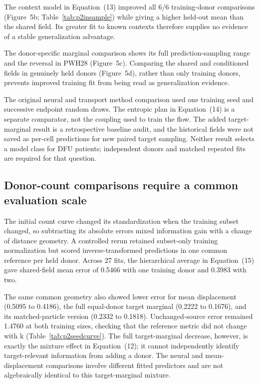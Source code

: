 \documentclass[10pt,a4paper]{article}
\begin{document}
The context model in Equation~(13) improved all 6/6 training-donor comparisons (Figure~5b; Table~\ref{tab:p2insample}) while giving a higher held-out mean than the shared field. Its greater fit to known contexts therefore supplies no evidence of a stable generalization advantage.




The donor-specific marginal comparison shows its full prediction-sampling range and the reversal in PWH28 (Figure~5c). Comparing the shared and conditioned fields in genuinely held donors (Figure~5d), rather than only training donors, prevents improved training fit from being read as generalization evidence.

The original neural and transport method comparison used one training seed and successive endpoint random draws. The entropic plan in Equation~(14) is a separate comparator, not the coupling used to train the flow. The added target-marginal result is a retrospective baseline audit, and the historical fields were not saved as per-cell predictions for new paired target sampling. Neither result selects a model class for DFU patients; independent donors and matched repeated fits are required for that question.

\subsection{Donor-count comparisons require a common evaluation scale}

The initial count curve changed its standardization when the training subset changed, so subtracting its absolute errors mixed information gain with a change of distance geometry. A controlled rerun retained subset-only training normalization but scored inverse-transformed predictions in one common reference per held donor. Across 27 fits, the hierarchical average in Equation~(15) gave shared-field mean error of 0.5466 with one training donor and 0.3983 with two.

The same common geometry also showed lower error for mean displacement (0.5095 to 0.4186), the full equal-donor target marginal (0.2222 to 0.1676), and its matched-particle version (0.2332 to 0.1818). Unchanged-source error remained 1.4760 at both training sizes, checking that the reference metric did not change with k (Table~\ref{tab:p2seedcurve}). The full target-marginal decrease, however, is exactly the mixture effect in Equation~(12); it cannot independently identify target-relevant information from adding a donor. The neural and mean-displacement comparisons involve different fitted predictors and are not algebraically identical to this target-marginal mixture.
\end{document}
